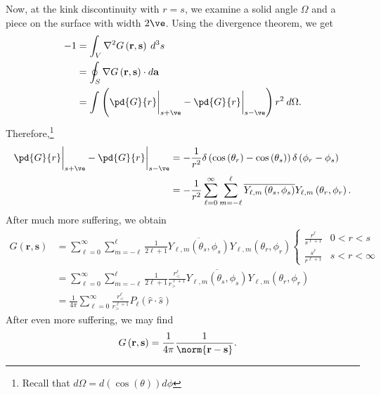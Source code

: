 \documentclass[10pt]{mypackage}
\begin{document}
\begin{example}
    Now, at the kink discontinuity with $r = s$, we examine a solid angle $\Omega$ and a piece on the surface with width $2\ve$. Using the divergence theorem, we get
    \begin{align*}
      -1 &= \int_{V}^{} \nabla^2G\left( \mathbf{r},\mathbf{s} \right)\:d^3s\\
         &= \oint_{S} \nabla G\left( \mathbf{r},\mathbf{s} \right)\cdot d\mathbf{a}\\
         &= \int_{}^{} \left( \pd{G}{r}\biggr\vert_{s+\ve} - \pd{G}{r}\biggr\vert_{s-\ve} \right)r^2\:d\Omega.
    \end{align*}
    Therefore,\footnote{Recall that $d\Omega = d(\cos(\theta))d\phi$}
    \begin{align*}
      \pd{G}{r}\biggr\vert_{s+\ve} - \pd{G}{r}\biggr\vert_{s-\ve} &= -\frac{1}{r^2}\delta\left( \cos\left( \theta_r \right)-\cos\left( \theta_s \right) \right)\delta\left( \phi_r-\phi_s \right)\\
                                                                  &= -\frac{1}{r^2}\sum_{\ell=0}^{\infty}\sum_{m=-\ell}^{\ell} \overline{Y_{\ell,m}\left( \theta_s,\phi_s \right)}Y_{\ell,m}\left( \theta_r,\phi_r \right).
    \end{align*}
    After much more suffering, we obtain
    \begin{align*}
      G\left( \mathbf{r},\mathbf{s} \right) &= \sum_{\ell=0}^{\infty}\sum_{m=-\ell}^{\ell} \frac{1}{2\ell + 1} \overline{Y_{\ell,m}\left( \theta_s,\phi_s \right)} Y_{\ell,m}\left( \theta_r,\phi_r \right) \begin{cases}
        \frac{r^{\ell}}{s^{\ell + 1}} & 0 < r < s\\
        \frac{s^{\ell}}{r^{\ell + 1}} & s < r < \infty
      \end{cases}\\
                                            &= \sum_{\ell=0}^{\infty}\sum_{m=-\ell}^{\ell}\frac{1}{2\ell + 1} \frac{r^{\ell}_{<}}{r^{\ell + 1}_{>}} \overline{Y_{\ell,m}\left( \theta_s,\phi_s \right)}Y_{\ell,m}\left( \theta_r,\phi_r \right)\\
                                            &= \frac{1}{4\pi}\sum_{\ell=0}^{\infty}\frac{r^{\ell}_{<}}{r^{\ell + 1}_{>}}P_{\ell}\left( \hat{r}\cdot \hat{s} \right)
    \end{align*}
    After even more suffering, we may find
    \begin{align*}
      G\left( \mathbf{r},\mathbf{s} \right) &= \frac{1}{4\pi}\frac{1}{\norm{\mathbf{r}-\mathbf{s}}}.
    \end{align*}
  \end{example}
\end{document}
